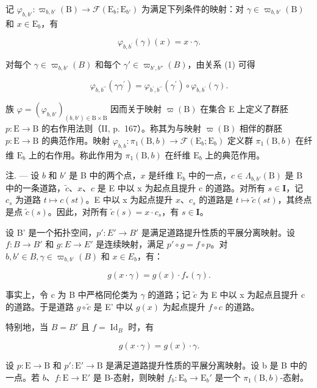 记 \(\varphi_{b,b'}\colon \varpi_{b,b'}(\mathrm{B})\to \mathcal{F}(\mathrm{E}_b;\mathrm{E}_{b'})\) 为满足下列条件的映射：对 \(\gamma \in \varpi_{b,b'}(\mathrm{B})\) 和 \(x\in \mathrm{E}_b\)，有

\[
\varphi_ {b, b ^ {\prime}} (\gamma) (x) = x \cdot \gamma .
\]

对每个 \(\gamma \in \varpi_{b,b'}(B)\) 和每个 \(\gamma' \in \varpi_{b',b''}(B)\)，由关系 (1) 可得

\[
\varphi_ {b, b ^ {\prime \prime}} (\gamma \gamma^ {\prime}) = \varphi_ {b ^ {\prime}, b ^ {\prime \prime}} (\gamma^ {\prime}) \circ \varphi_ {b, b ^ {\prime}} (\gamma).\tag{2}
\]

族 \(\varphi = (\varphi_{b,b'})_{(b,b')\in\mathrm{B}\times\mathrm{B}}\) 因而关于映射 \(\varpi(\mathrm{B})\) 在集合 E 上定义了群胚 \(p\colon\mathrm{E}\to\mathrm{B}\) 的右作用法则（II, p.~167）。称其为与映射 \(\varpi(\mathrm{B})\) 相伴的群胚 \(p\colon\mathrm{E}\to\mathrm{B}\) 的典范作用。映射 \(\varphi_{b,b}\colon\pi_{1}(\mathrm{B},b)\to\mathcal{F}(\mathrm{E}_{b};\mathrm{E}_{b})\) 定义群 \(\pi_{1}(\mathrm{B},b)\) 在纤维 \(\mathrm{E}_{b}\) 上的右作用。称此作用为 \(\pi_{1}(\mathrm{B},b)\) 在纤维 \(\mathrm{E}_{b}\) 上的典范作用。

注. --- 设 \(b\) 和 \(b'\) 是 B 中的两个点，\(x\) 是纤维 \(\mathrm{E}_b\) 中的一点，\(c \in \Lambda_{b,b'}(\mathrm{B})\) 是 B 中的一条道路，\(\widetilde{c}\)、\(x\)、\(c\) 是 E 中以 x 为起点且提升 c 的道路。对所有 \(s \in \mathbf{I}\)，记 \(c_s\) 为道路 \(t \mapsto c(st)\)。E 中以 x 为起点提升 \(x\)、\(c_s\) 的道路是 \(t \mapsto \widetilde{c}(st)\)，其终点是点 \(\widetilde{c}(s)\)。因此，对所有 \(\widetilde{c}(s) = x \cdot c_s\)，有 \(s \in \mathbf{I}\)。

设 B' 是一个拓扑空间，\(p'\colon E'\to B'\) 是满足道路提升性质的平展分离映射。设 \(f\colon B\to B'\) 和 \(g\colon E\to E'\) 是连续映射，满足 \(p'\circ g=f\circ p\)。对 \(b, b'\in B, \gamma\in\varpi_{b,b'}(B)\) 和 \(x\in E_b\)，有：

\[
g (x \cdot \gamma) = g (x) \cdot f _ {*} (\gamma).\tag{3}
\]

事实上，令 c 为 B 中严格同伦类为 \(\gamma\) 的道路；记 \(\widetilde{c}\) 为 E 中以 x 为起点且提升 c 的道路。于是道路 \(g \circ \widetilde{c}\) 是 E' 中以 \(g(x)\) 为起点提升 \(f \circ c\) 的道路。

特别地，当 \(B = B'\) 且 \(f = \operatorname{Id}_{B}\) 时，有

\[
g (x \cdot \gamma) = g (x) \cdot \gamma .\tag{4}
\]

设 \(p \colon \mathrm{E} \to \mathrm{B}\) 和 \(p' \colon \mathrm{E}' \to \mathrm{B}\) 是满足道路提升性质的平展分离映射。设 b 是 B 中的一点。若 \(b\)、\(f \colon \mathrm{E} \to \mathrm{E}'\) 是 B-态射，则映射 \(f_b \colon \mathrm{E}_b \to \mathrm{E}_b'\) 是一个 \(\pi_1(\mathrm{B}, b)\)-态射。

